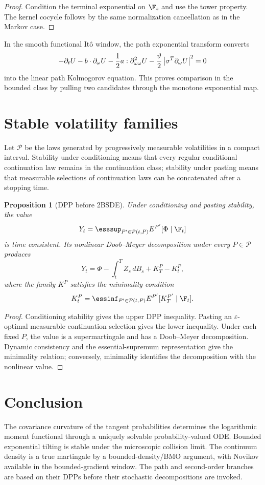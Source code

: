 \documentclass[11pt,reqno]{amsart}
\newtheorem{proposition}[theorem]{Proposition}
\theoremstyle{definition}
\newcommand{\abs}[1]{\left\lvert#1\right\rvert}
\begin{document}
\begin{proof}
Condition the terminal exponential on $\F_s$ and use the tower property.  The
kernel cocycle follows by the same normalization cancellation as in the Markov
case.
\end{proof}

In the smooth functional It\^o window, the path exponential transform converts
\[
 -\partial_tU-b\cdot\partial_\omega U
 -{1\over2}a:\partial_{\omega\omega}^2U
 -{\vartheta\over2}\abs{\sigma^T\partial_\omega U}^2=0
\]
into the linear path Kolmogorov equation.  This proves comparison in the
bounded class by pulling two candidates through the monotone exponential map.

\section{Stable volatility families}

Let $\mathcal P$ be the laws generated by progressively measurable
volatilities in a compact interval.  Stability under conditioning means that
every regular conditional continuation law remains in the continuation class;
stability under pasting means that measurable selections of continuation laws
can be concatenated after a stopping time.

\begin{proposition}[DPP before 2BSDE]\label{prop:DPP-2BSDE}
Under conditioning and pasting stability, the value
\[
 Y_t=\esssup_{P'\in\mathcal P(t,P)}
 E^{P'}[\Phi\mid\F_t]
\]
is time consistent.  Its nonlinear Doob--Meyer decomposition under every
$P\in\mathcal P$ produces
\[
 Y_t=\Phi-\int_t^TZ_s\,dB_s+K_T^P-K_t^P,
\]
where the family $K^P$ satisfies the minimality condition
\[
 K_t^P=\essinf_{P'\in\mathcal P(t,P)}E^{P'}[K_T^{P'}\mid\F_t].
\]
\end{proposition}

\begin{proof}
Conditioning stability gives the upper DPP inequality.  Pasting an
$\varepsilon$-optimal measurable continuation selection gives the lower
inequality.  Under each fixed $P$, the value is a supermartingale and has a
Doob--Meyer decomposition.  Dynamic consistency and the essential-supremum
representation give the minimality relation; conversely, minimality identifies
the decomposition with the nonlinear value.
\end{proof}

\section{Conclusion}

The covariance curvature of the tangent probabilities determines the
logarithmic moment functional through a uniquely solvable probability-valued
ODE.  Bounded exponential tilting is stable under the microscopic collision
limit.  The continuum density is a true martingale by a bounded-density/BMO
argument, with Novikov available in the bounded-gradient window.  The path and
second-order branches are based on their DPPs before their stochastic
decompositions are invoked.



\end{document}

